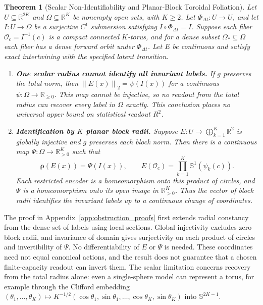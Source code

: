 \documentclass[10pt]{article}
\newtheorem{theorem}{Theorem}
\theoremstyle{definition}
\theoremstyle{remark}
\newcommand{\R}{\mathbb{R}}
\newcommand{\Sp}{\mathbb{S}}
\newcommand{\norm}[1]{\left\lVert #1 \right\rVert}
\begin{document}
\begin{theorem}[Scalar Non-Identifiability and Planar-Block Toroidal Foliation]
\label{thm:toroidal_kblock}
Let $U\subseteq\R^{2K}$ and $\Omega\subseteq\R^K$ be nonempty open sets, with $K\ge2$. Let $\Phi_{\Delta t}:U\to U$, and let $I:U\to\Omega$ be a surjective $C^1$ submersion satisfying $I\circ\Phi_{\Delta t}=I$. Suppose each fiber $\mathcal O_c=I^{-1}(c)$ is a compact connected $K$-torus, and for a dense subset $\Omega_*\subseteq\Omega$ each fiber has a dense forward orbit under $\Phi_{\Delta t}$. Let $E$ be continuous and satisfy exact intertwining with the specified latent transition.
\begin{enumerate}
    \item[\textbf{(a)}] \textbf{One scalar radius cannot identify all invariant labels.} If $g$ preserves the total norm, then $\norm{E(x)}_2=\psi(I(x))$ for a continuous $\psi:\Omega\to\R_{\ge0}$. This map cannot be injective, so no readout from the total radius can recover every label in $\Omega$ exactly. This conclusion places no universal upper bound on statistical readout $R^2$.
    \item[\textbf{(b)}] \textbf{Identification by $K$ planar block radii.} Suppose $E:U\to\bigoplus_{k=1}^K\R^2$ is globally injective and $g$ preserves each block norm. Then there is a continuous map $\Psi:\Omega\to\R_{>0}^K$ such that
    \begin{equation}
        \bm\rho(E(x))=\Psi(I(x)),\qquad
        E(\mathcal O_c)=\prod_{k=1}^K\Sp^1(\psi_k(c)).
        \label{eq:toroidal_foliation}
    \end{equation}
    Each restricted encoder is a homeomorphism onto this product of circles, and $\Psi$ is a homeomorphism onto its open image in $\R_{>0}^K$. Thus the vector of block radii identifies the invariant labels up to a continuous change of coordinates.
\end{enumerate}
\end{theorem}

The proof in Appendix~\ref{app:obstruction_proofs} first extends radial constancy from the dense set of labels using local sections. Global injectivity excludes zero block radii, and invariance of domain gives surjectivity on each product of circles and invertibility of $\Psi$. No differentiability of $E$ or $\Psi$ is needed. These coordinates need not equal canonical actions, and the result does not guarantee that a chosen finite-capacity readout can invert them. The scalar limitation concerns recovery from the total radius alone: even a single-sphere model can represent a torus, for example through the Clifford embedding $(\theta_1,\ldots,\theta_K)\mapsto K^{-1/2}(\cos\theta_1,\sin\theta_1,\ldots,\cos\theta_K,\sin\theta_K)$ into $\Sp^{2K-1}$.
\end{document}
